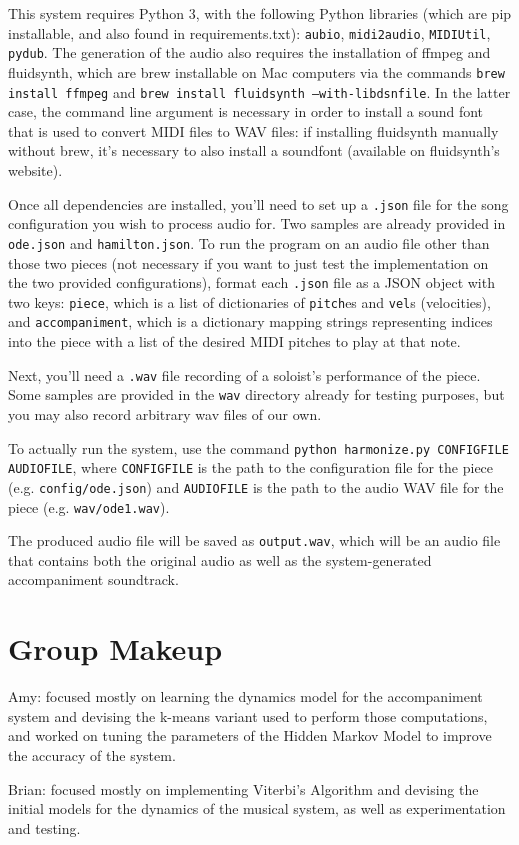 \documentclass[11pt]{article}
\begin{document}
This system requires Python 3, with the following Python libraries (which are pip installable, and also found in requirements.txt): \texttt{aubio}, \texttt{midi2audio}, \texttt{MIDIUtil}, \texttt{pydub}. The generation of the audio also requires the installation of ffmpeg and fluidsynth, which are brew installable on Mac computers via the commands \texttt{brew install ffmpeg} and \texttt{brew install fluidsynth --with-libdsnfile}. In the latter case, the command line argument is necessary in order to install a sound font that is used to convert MIDI files to WAV files: if installing fluidsynth manually without brew, it's necessary to also install a soundfont (available on fluidsynth's website).

Once all dependencies are installed, you'll need to set up a \texttt{.json} file
for the song configuration you wish to process audio for. Two samples are already provided in
\texttt{ode.json} and \texttt{hamilton.json}. To run the program on an audio file other
than those two pieces (not necessary if you want to just test the implementation
on the two provided configurations),
format each \texttt{.json} file as a JSON object with two keys:
\texttt{piece}, which is a list of dictionaries of \texttt{pitch}es and \texttt{vel}s
(velocities), and \texttt{accompaniment}, which is a dictionary mapping strings
representing indices into the piece with a list of the desired MIDI pitches to play
at that note.

Next, you'll need a \texttt{.wav} file recording of a soloist's performance of the piece.
Some samples are provided in the \texttt{wav} directory already for testing purposes,
but you may also record arbitrary wav files of our own.

To actually run the system, use the command
\texttt{python harmonize.py CONFIGFILE AUDIOFILE}, where
\texttt{CONFIGFILE} is the path to the configuration file for the piece
(e.g. \texttt{config/ode.json})
and \texttt{AUDIOFILE} is the path to the audio WAV file for the piece
(e.g. \texttt{wav/ode1.wav}).

The produced audio file will be saved as \texttt{output.wav}, which will
be an audio file that contains both the original audio as well as the system-generated
accompaniment soundtrack.

\section{Group Makeup}

Amy: focused mostly on learning the dynamics model for the accompaniment
system and devising the k-means variant used to perform those computations,
and worked on tuning the parameters of the Hidden Markov Model to improve
the accuracy of the system.

Brian: focused mostly on implementing Viterbi's Algorithm and devising
the initial models for the dynamics of the musical system, as well as
experimentation and testing.



\end{document}
